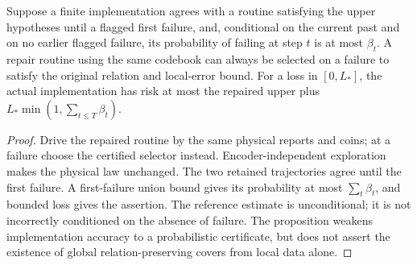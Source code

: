 \begin{proposition}\label{prop:repair}
Suppose a finite implementation agrees with a routine satisfying the upper hypotheses until a flagged first failure, and, conditional on the current past and on no earlier flagged failure, its probability of failing at step $t$ is at most $\beta_t$. A repair routine using the same codebook can always be selected on a failure to satisfy the original relation and local-error bound. For a loss in $[0,L_*]$, the actual implementation has risk at most the repaired upper plus $L_*\min(1,\sum_{t\le T}\beta_t)$.
\end{proposition}
\begin{proof}
Drive the repaired routine by the same physical reports and coins; at a failure choose the certified selector instead. Encoder-independent exploration makes the physical law unchanged. The two retained trajectories agree until the first failure. A first-failure union bound gives its probability at most $\sum_t\beta_t$, and bounded loss gives the assertion. The reference estimate is unconditional; it is not incorrectly conditioned on the absence of failure. The proposition weakens implementation accuracy to a probabilistic certificate, but does not assert the existence of global relation-preserving covers from local data alone.
\end{proof}

